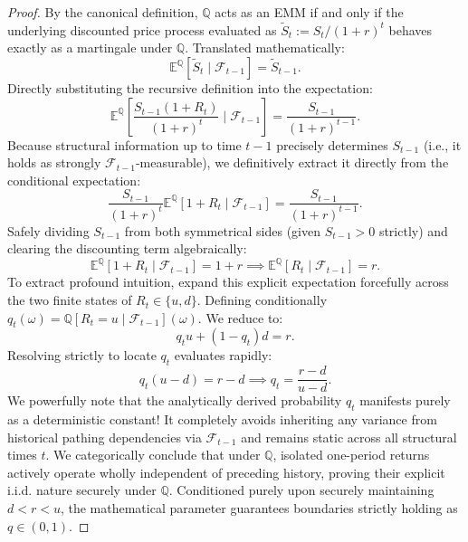 \begin{proof}
    By the canonical definition, $\mathbb{Q}$ acts as an EMM if and only if the underlying discounted price process evaluated as $\widetilde{S}_t := S_t / (1+r)^t$ behaves exactly as a martingale under $\mathbb{Q}$. Translated mathematically:
    \begin{equation}
        \mathbb{E}^\mathbb{Q} \left[ \widetilde{S}_t \mid \mathcal{F}_{t-1} \right] = \widetilde{S}_{t-1}.
    \end{equation}
    Directly substituting the recursive definition into the expectation:
    \begin{equation}
        \mathbb{E}^\mathbb{Q} \left[ \frac{S_{t-1}(1+R_t)}{(1+r)^t} \mid \mathcal{F}_{t-1} \right] = \frac{S_{t-1}}{(1+r)^{t-1}}.
    \end{equation}
    Because structural information up to time $t-1$ precisely determines $S_{t-1}$ (i.e., it holds as strongly $\mathcal{F}_{t-1}$-measurable), we definitively extract it directly from the conditional expectation:
    \begin{equation}
        \frac{S_{t-1}}{(1+r)^t} \mathbb{E}^\mathbb{Q} \left[ 1+R_t \mid \mathcal{F}_{t-1} \right] = \frac{S_{t-1}}{(1+r)^{t-1}}.
    \end{equation}
    Safely dividing $S_{t-1}$ from both symmetrical sides (given $S_{t-1} > 0$ strictly) and clearing the discounting term algebraically:
    \begin{equation}
        \mathbb{E}^\mathbb{Q} \left[ 1+R_t \mid \mathcal{F}_{t-1} \right] = 1+r \implies \mathbb{E}^\mathbb{Q} \left[ R_t \mid \mathcal{F}_{t-1} \right] = r.
    \end{equation}
    To extract profound intuition, expand this explicit expectation forcefully across the two finite states of $R_t \in \{u, d\}$. Defining conditionally $q_t(\omega) = \mathbb{Q}[R_t=u \mid \mathcal{F}_{t-1}](\omega)$. We reduce to:
    \begin{equation}
        q_t u + (1-q_t) d = r.
    \end{equation}
    Resolving strictly to locate $q_t$ evaluates rapidly:
    \begin{equation}
        q_t(u - d) = r - d \implies q_t = \frac{r-d}{u-d}.
    \end{equation}
    We powerfully note that the analytically derived probability $q_t$ manifests purely as a deterministic constant! It completely avoids inheriting any variance from historical pathing dependencies via $\mathcal{F}_{t-1}$ and remains static across all structural times $t$. We categorically conclude that under $\mathbb{Q}$, isolated one-period returns actively operate wholly independent of preceding history, proving their explicit i.i.d. nature securely under $\mathbb{Q}$. Conditioned purely upon securely maintaining $d < r < u$, the mathematical parameter guarantees boundaries strictly holding as $q \in (0,1)$.
    

\end{proof}

